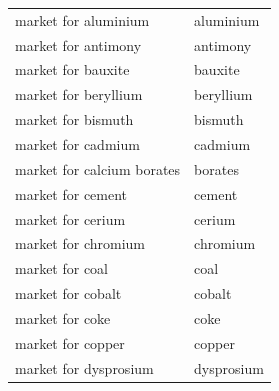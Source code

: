 \documentclass{article}
\begin{document}
\begin{longtable}{ll}
    market for aluminium       & aluminium                                                                                         \\
    market for antimony        & antimony                                                                                          \\
    market for bauxite         & bauxite                                                                                           \\
    market for beryllium       & beryllium                                                                                         \\
    market for bismuth         & bismuth                                                                                           \\
    market for cadmium         & cadmium                                                                                           \\
    market for calcium borates & borates                                                                                           \\
    market for cement          & cement                                                                                            \\
    market for cerium          & cerium                                                                                            \\
    market for chromium        & chromium                                                                                          \\
    market for coal            & coal                                                                                              \\
    market for cobalt          & cobalt                                                                                            \\
    market for coke            & coke                                                                                              \\
    market for copper          & copper                                                                                            \\
    market for dysprosium      & dysprosium                                                                                        \\

\end{longtable}
\end{document}
